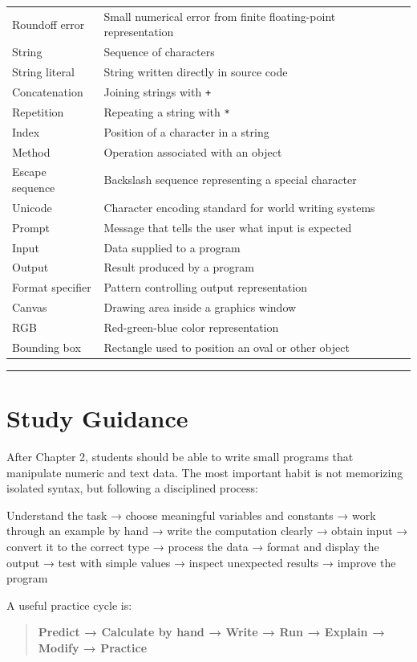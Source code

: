 \documentclass[
]{article}
\newenvironment{Shaded}{\begin{snugshade}}{\end{snugshade}}
\newcommand{\NormalTok}[1]{#1}
\begin{document}
{\begin{longtable}[]{@{}
  >{\raggedright\arraybackslash}p{}
  >{\raggedright\arraybackslash}p{}@{}}
Roundoff error & Small numerical error from finite floating-point
representation \\
String & Sequence of characters \\
String literal & String written directly in source code \\
Concatenation & Joining strings with \texttt{+} \\
Repetition & Repeating a string with \texttt{*} \\
Index & Position of a character in a string \\
Method & Operation associated with an object \\
Escape sequence & Backslash sequence representing a special character \\
Unicode & Character encoding standard for world writing systems \\
Prompt & Message that tells the user what input is expected \\
Input & Data supplied to a program \\
Output & Result produced by a program \\
Format specifier & Pattern controlling output representation \\
Canvas & Drawing area inside a graphics window \\
RGB & Red-green-blue color representation \\
Bounding box & Rectangle used to position an oval or other object \\
\end{longtable}
}

\begin{center}\rule{0.5\linewidth}{0.5pt}\end{center}

\section{Study Guidance}\label{study-guidance}

After Chapter 2, students should be able to write small programs that
manipulate numeric and text data. The most important habit is not
memorizing isolated syntax, but following a disciplined process:

\begin{Shaded}
\begin{Highlighting}[]
\NormalTok{Understand the task}
\NormalTok{→ choose meaningful variables and constants}
\NormalTok{→ work through an example by hand}
\NormalTok{→ write the computation clearly}
\NormalTok{→ obtain input}
\NormalTok{→ convert it to the correct type}
\NormalTok{→ process the data}
\NormalTok{→ format and display the output}
\NormalTok{→ test with simple values}
\NormalTok{→ inspect unexpected results}
\NormalTok{→ improve the program}
\end{Highlighting}
\end{Shaded}

A useful practice cycle is:

\begin{quote}
\textbf{Predict → Calculate by hand → Write → Run → Explain → Modify →
Practice}
\end{quote}
\end{document}

